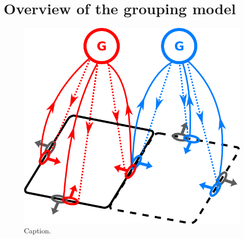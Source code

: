 \section{Overview of the grouping model}
 \begin{figure}[t]
 \centering
 \includegraphics[width=\textwidth]{Intro/figs/groupingcircuit}
 \makeatletter
 \let\@currsize\normalsize
 \caption{Caption.}
 \label{fig:figure}
 \end{figure}

